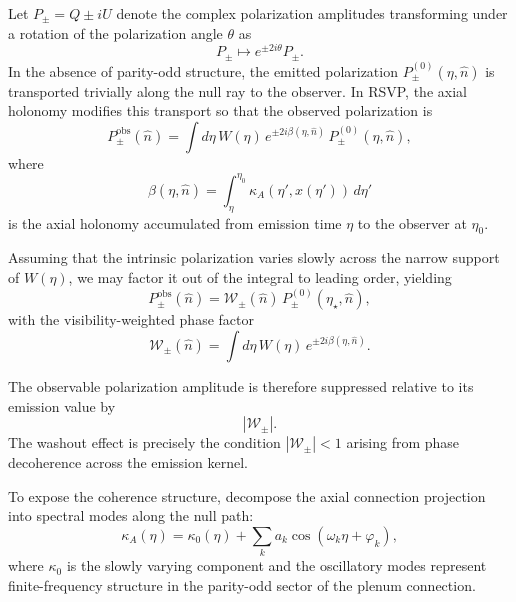 \documentclass[12pt]{article}
\begin{document}
Let $P_\pm = Q \pm iU$ denote the complex polarization amplitudes transforming under a rotation of the polarization angle $\theta$ as
\begin{equation}
P_\pm \mapsto e^{\pm 2 i \theta} P_\pm.
\end{equation}
In the absence of parity-odd structure, the emitted polarization $P_\pm^{(0)}(\eta,\hat n)$ is transported trivially along the null ray to the observer. In RSVP, the axial holonomy modifies this transport so that the observed polarization is
\begin{equation}
P_\pm^{\mathrm{obs}}(\hat n)
=
\int d\eta \,
W(\eta)
\, e^{\pm 2 i \beta(\eta,\hat n)}
\, P_\pm^{(0)}(\eta,\hat n),
\end{equation}
where
\begin{equation}
\beta(\eta,\hat n)
=
\int_{\eta}^{\eta_0}
\kappa_A(\eta',x(\eta'))\, d\eta'
\end{equation}
is the axial holonomy accumulated from emission time $\eta$ to the observer at $\eta_0$.

Assuming that the intrinsic polarization varies slowly across the narrow support of $W(\eta)$, we may factor it out of the integral to leading order, yielding
\begin{equation}
P_\pm^{\mathrm{obs}}(\hat n)
=
\mathcal{W}_\pm(\hat n)
\, P_\pm^{(0)}(\eta_\star,\hat n),
\end{equation}
with the visibility-weighted phase factor
\begin{equation}
\mathcal{W}_\pm(\hat n)
=
\int d\eta \,
W(\eta)
\, e^{\pm 2 i \beta(\eta,\hat n)}.
\end{equation}

The observable polarization amplitude is therefore suppressed relative to its emission value by
\begin{equation}
\left|\mathcal{W}_\pm\right|.
\end{equation}
The washout effect is precisely the condition $\left|\mathcal{W}_\pm\right| < 1$ arising from phase decoherence across the emission kernel.

To expose the coherence structure, decompose the axial connection projection into spectral modes along the null path:
\begin{equation}
\kappa_A(\eta)
=
\kappa_0(\eta)
+
\sum_{k}
a_k \cos(\omega_k \eta + \varphi_k),
\end{equation}
where $\kappa_0$ is the slowly varying component and the oscillatory modes represent finite-frequency structure in the parity-odd sector of the plenum connection.
\end{document}
